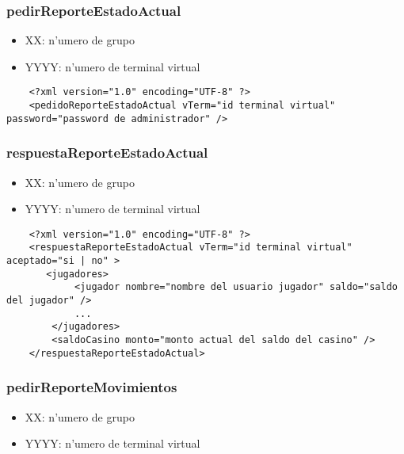 \subsubsection{pedirReporteEstadoActual}
 
\begin{itemize}
    \item{XX: n'umero de grupo}
    \item{YYYY: n'umero de terminal virtual}
\end{itemize}

\begin{verbatim}
    <?xml version="1.0" encoding="UTF-8" ?>
    <pedidoReporteEstadoActual vTerm="id terminal virtual" password="password de administrador" />
\end{verbatim}


\subsubsection{respuestaReporteEstadoActual}
 
\begin{itemize}
    \item{XX: n'umero de grupo}
    \item{YYYY: n'umero de terminal virtual}
\end{itemize}

\begin{verbatim}
    <?xml version="1.0" encoding="UTF-8" ?>
    <respuestaReporteEstadoActual vTerm="id terminal virtual" aceptado="si | no" >
       <jugadores>
            <jugador nombre="nombre del usuario jugador" saldo="saldo del jugador" />
            ... 
        </jugadores>
        <saldoCasino monto="monto actual del saldo del casino" />
    </respuestaReporteEstadoActual>
\end{verbatim}



\subsubsection{pedirReporteMovimientos}
 
\begin{itemize}
    \item{XX: n'umero de grupo}
    \item{YYYY: n'umero de terminal virtual}
\end{itemize}

